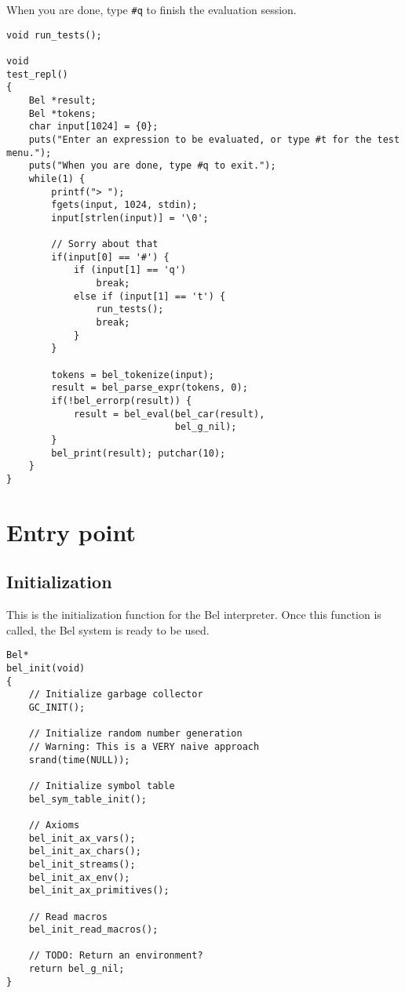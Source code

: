 \documentclass[openright,a4paper,twoside,12pt]{memoir}
\begin{document}
When you are done, type \texttt{\#q} to finish the evaluation session.

\begin{verbatim}
void run_tests();

void
test_repl()
{
    Bel *result;
    Bel *tokens;
    char input[1024] = {0};
    puts("Enter an expression to be evaluated, or type #t for the test menu.");
    puts("When you are done, type #q to exit.");
    while(1) {
        printf("> ");
        fgets(input, 1024, stdin);
        input[strlen(input)] = '\0';

        // Sorry about that
        if(input[0] == '#') {
            if (input[1] == 'q')
                break;
            else if (input[1] == 't') {
                run_tests();
                break;
            }
        }

        tokens = bel_tokenize(input);
        result = bel_parse_expr(tokens, 0);
        if(!bel_errorp(result)) {
            result = bel_eval(bel_car(result),
                              bel_g_nil);
        }
        bel_print(result); putchar(10);
    }
}
\end{verbatim}

\chapter{Entry point}
\label{sec:orge78fa05}
\section{Initialization}
\label{sec:org8830167}

This is the initialization function for the Bel interpreter. Once this
function is called, the Bel system is ready to be used.

\begin{verbatim}
Bel*
bel_init(void)
{
    // Initialize garbage collector
    GC_INIT();

    // Initialize random number generation
    // Warning: This is a VERY naive approach
    srand(time(NULL));

    // Initialize symbol table
    bel_sym_table_init();

    // Axioms
    bel_init_ax_vars();
    bel_init_ax_chars();
    bel_init_streams();
    bel_init_ax_env();
    bel_init_ax_primitives();

    // Read macros
    bel_init_read_macros();

    // TODO: Return an environment?
    return bel_g_nil;
}
\end{verbatim}
\end{document}
